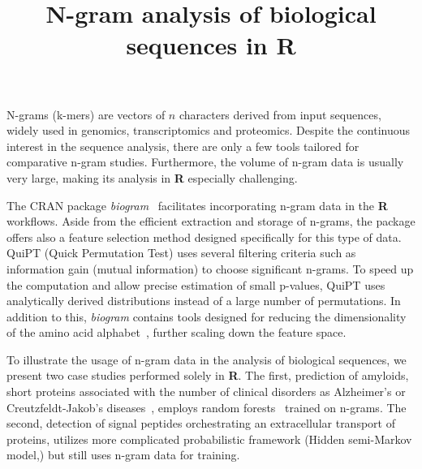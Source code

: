 \documentclass[a4paper,10pt]{article}
\title{N-gram analysis of biological sequences in R}
\author{}
\date{}
\begin{document}
\maketitle

N-grams (k-mers) are vectors of $n$ characters derived from input sequences, 
widely used in genomics, transcriptomics and proteomics. Despite the continuous 
interest in the sequence analysis, there are only a few tools tailored for 
comparative n-gram studies. Furthermore, the volume of n-gram data is usually 
very large, making its analysis in \textbf{R} especially challenging. 

The CRAN package \textit{biogram}~\citep{burdukiewicz_biogram:_2015} facilitates 
incorporating n-gram data in the \textbf{R} workflows. Aside from the efficient 
extraction and storage of n-grams, the package offers also a feature selection 
method designed specifically for this type of data. QuiPT (Quick Permutation 
Test) uses several filtering criteria such as information gain (mutual 
information) to choose significant n-grams. To speed up the computation and 
allow precise estimation of small p-values, QuiPT uses analytically derived 
distributions instead of a large number of permutations. In addition to this, 
\textit{biogram} contains tools designed for reducing the dimensionality of the 
amino acid alphabet~\citep{murphy_simplified_2000}, further scaling down the 
feature space.

To illustrate the usage of n-gram data in the analysis of biological sequences,  
we present two case studies performed solely in \textbf{R}. The first,   
prediction of amyloids, short proteins associated with the number of clinical   
disorders as Alzheimer's or Creutzfeldt-Jakob’s 
diseases~\citep{fandrich_oligomeric_2012}, employs random 
forests~\citep{wright_ranger:_2015} trained on n-grams. The second, detection   
of signal peptides orchestrating an extracellular transport of proteins, 
utilizes more complicated probabilistic framework (Hidden semi-Markov 
model,) but still uses n-gram data for training. 


\end{document}
